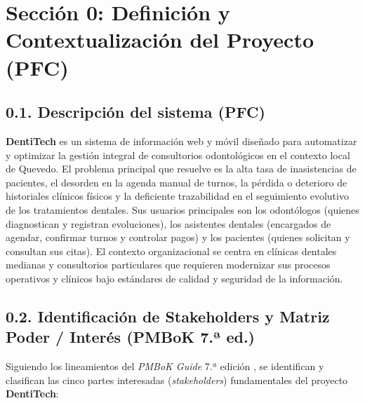 \documentclass[11pt,a4paper]{article}
\begin{document}
\tableofcontents
\newpage

\section*{Sección 0: Definición y Contextualización del Proyecto (PFC)}

\subsection*{0.1. Descripción del sistema (PFC)}

\textbf{DentiTech} es un sistema de información web y móvil diseñado para automatizar y optimizar la gestión integral de consultorios odontológicos en el contexto local de Quevedo. El problema principal que resuelve es la alta tasa de inasistencias de pacientes, el desorden en la agenda manual de turnos, la pérdida o deterioro de historiales clínicos físicos y la deficiente trazabilidad en el seguimiento evolutivo de los tratamientos dentales. Sus usuarios principales son los odontólogos (quienes diagnostican y registran evoluciones), los asistentes dentales (encargados de agendar, confirmar turnos y controlar pagos) y los pacientes (quienes solicitan y consultan sus citas). El contexto organizacional se centra en clínicas dentales medianas y consultorios particulares que requieren modernizar sus procesos operativos y clínicos bajo estándares de calidad y seguridad de la información.

\subsection*{0.2. Identificación de Stakeholders y Matriz Poder / Interés (PMBoK 7.ª ed.)}

Siguiendo los lineamientos del \textit{PMBoK Guide} 7.ª edición \cite{pmbok2021}, se identifican y clasifican las cinco partes interesadas (\textit{stakeholders}) fundamentales del proyecto \textbf{DentiTech}:
\end{document}
